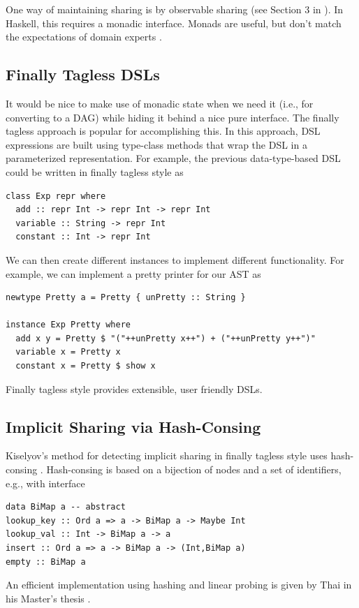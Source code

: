 \documentclass[runningheads]{llncs}
\begin{document}
One way of maintaining sharing is by observable sharing (see Section 3 in \cite{kiselyov:sharing}).
In Haskell, this requires a monadic interface.
Monads are useful, but don't match the expectations of domain experts \cite{odonnell:embedding}.

\subsection{Finally Tagless DSLs}

 It would be nice
to make use of monadic state when we need it (i.e., for converting to a DAG)
while hiding it behind a nice pure interface. The finally tagless approach 
\cite{carette:finallytagless} is popular for accomplishing this. In this
approach, DSL expressions are built using type-class methods that wrap the DSL in
a parameterized representation. For example, the previous data-type-based DSL
could be written in finally tagless style as

\begin{verbatim}
class Exp repr where
  add :: repr Int -> repr Int -> repr Int
  variable :: String -> repr Int
  constant :: Int -> repr Int
\end{verbatim}

We can then create different instances to implement different functionality.
For example, we can implement a pretty printer for our AST as
\begin{verbatim}
newtype Pretty a = Pretty { unPretty :: String }

instance Exp Pretty where
  add x y = Pretty $ "("++unPretty x++") + ("++unPretty y++")"
  variable x = Pretty x
  constant x = Pretty $ show x
\end{verbatim}

Finally tagless style provides extensible, user friendly DSLs.

\subsection{Implicit Sharing via Hash-Consing}

Kiselyov's method
 for detecting implicit sharing in finally tagless
style uses hash-consing \cite{kiselyov:sharing}.
Hash-consing is based on a bijection of nodes and a set of identifiers,
e.g., with interface 
\begin{verbatim}
data BiMap a -- abstract
lookup_key :: Ord a => a -> BiMap a -> Maybe Int
lookup_val :: Int -> BiMap a -> a
insert :: Ord a => a -> BiMap a -> (Int,BiMap a)
empty :: BiMap a
\end{verbatim}
An efficient implementation using hashing and linear probing is given by Thai
in his Master's thesis \cite{thai2021type}.
\end{document}
